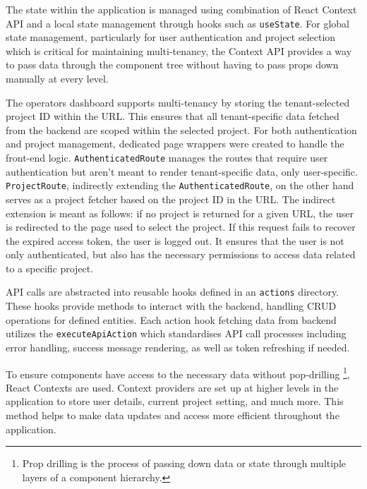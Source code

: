 The state within the application is managed using combination of React Context API and a local state management through hooks such as \texttt{useState}.
For global state management, particularly for user authentication and project selection which is critical for maintaining multi-tenancy, the Context API provides a way to pass data through the component tree without having to pass props down manually at every level.

The operators dashboard supports multi-tenancy by storing the tenant-selected project ID within the URL.
This ensures that all tenant-specific data fetched from the backend are scoped within the selected project.
For both authentication and project management, dedicated page wrappers were created to handle the front-end logic.
\texttt{AuthenticatedRoute} manages the routes that require user authentication but aren't meant to render tenant-specific data, only user-specific.
\texttt{ProjectRoute}, indirectly extending the \texttt{AuthenticatedRoute}, on the other hand serves as a project fetcher based on the project ID in the URL.
The indirect extension is meant as follows: if no project is returned for a given URL, the user is redirected to the page used to select the project. If this request fails to recover the expired access token, the user is logged out.
It ensures that the user is not only authenticated, but also has the necessary permissions to access data related to a specific project.



API calls are abstracted into reusable hooks defined in an \texttt{actions} directory.
These hooks provide methods to interact with the backend, handling CRUD operations for defined entities.
Each action hook fetching data from backend utilizes the \texttt{executeApiAction} which standardises API call processes including error handling, success message rendering, as well as token refreshing if needed.

To ensure components have access to the necessary data without pop-drilling \footnote{Prop drilling is the process of passing down data or state through multiple layers of a component hierarchy.}, React Contexts are used.
Context providers are set up at higher levels in the application to store user details, current project setting, and much more.
This method helps to make data updates and access more efficient throughout the application. 


